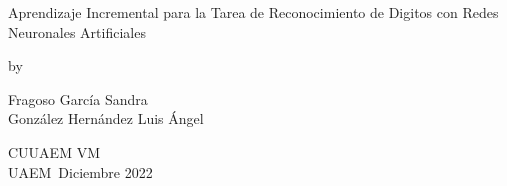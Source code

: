 \begin{titlepage}
    \begin{center}
    \vspace*{1.0in}
    {\LARGE Aprendizaje Incremental para la Tarea de Reconocimiento de Digitos con Redes Neuronales Artificiales}
    \par
    \vspace{0.5in}
    {by}
    \par
    \vspace{0.2in}
    {\large Fragoso Garc\'ia Sandra \\ Gonz\'alez Hern\'andez Luis \'Angel}
    \par					%
    \vspace{2in}
    
    \par
    \vspace{2in}
    \begin{flushright}
     
    
    CUUAEM VM \\
    UAEM\
    Diciembre 2022
    
    \end{flushright}
    
    \end{center}
\end{titlepage}